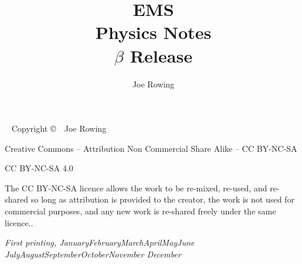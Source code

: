 \documentclass[a4paper]{tufte-book}%
\title{EMS \\Physics Notes \\ $\beta$ Release}
\author[Joe Rowing]{Joe Rowing}
\newcommand{\monthyear}{%
  \ifcase\month\or January\or February\or March\or April\or May\or June\or
  July\or August\or September\or October\or November\or
  December\fi\space\number\year
}
\newcommand{\blankpage}{\newpage\hbox{}\thispagestyle{empty}\newpage}
\begin{document}



\maketitle


\newpage
\begin{fullwidth}
~\vfill
\thispagestyle{empty}
\setlength{\parindent}{0pt}
\setlength{\parskip}{\baselineskip}
Copyright \copyright\ \the\year\ Joe Rowing

\par{}

\par{}

\par Creative Commons – Attribution Non Commercial Share Alike – CC BY-NC-SA

CC BY-NC-SA 4.0

The CC BY-NC-SA licence allows the work to be re-mixed, re-used, and re-shared so long as  attribution is provided to the creator, the work is not used for commercial purposes, and any new work is re-shared freely under the same licence..

\par\textit{First printing, \monthyear}
\end{fullwidth}

\tableofcontents











%













 
 

 
 
 
 
 

%
\setcounter{tocdepth}{10}

\printindex
\end{document}

